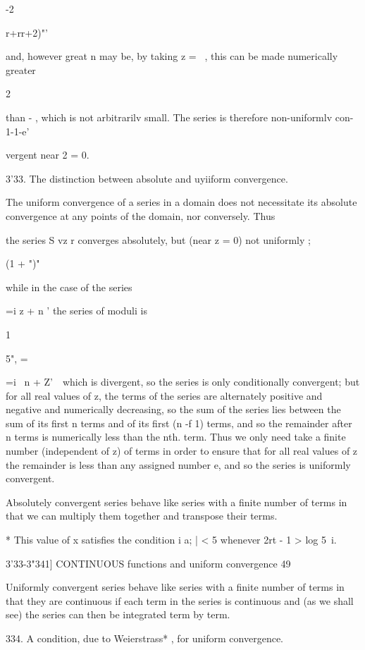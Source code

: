 -2

r+rr+2)"'

and, however great n may be, by taking z = ~, this can be made
numerically greater

2

than - , which is not arbitrarilv small. The series is therefore
non-uniformlv con- 1-1-e'

vergent near 2 = 0.

3'33. The distinction between absolute and uyiiform convergence.

The uniform convergence of a series in a domain does not necessitate
its absolute convergence at any points of the domain, nor conversely.
Thus

the series S vz r converges absolutely, but (near z = 0) not uniformly
;

(1 + ")"

while in the case of the series

 =i z + n ' the series of moduli is

1

5", =



 =i \ n + Z'\ \ which is divergent, so the series is only
conditionally convergent; but for all real values of z, the terms of
the series are alternately positive and negative and numerically
decreasing, so the sum of the series lies between the sum of its first
n terms and of its first (n -f 1) terms, and so the remainder after n
terms is numerically less than the nth. term. Thus we only need take a
finite number (independent of z) of terms in order to ensure that for
all real values of z the remainder is less than any assigned number e,
and so the series is uniformly convergent.

Absolutely convergent series behave like series with a finite number
of terms in that we can multiply them together and transpose their
terms.

* This value of x satisfies the condition i a; | < 5 whenever 2rt - 1
> log 5~i.



3'33-3"341] CONTINUOUS functions and uniform convergence 49

Uniformly convergent series behave like series with a finite number of
terms in that they are continuous if each term in the series is
continuous and (as we shall see) the series can then be integrated
term by term.

334. A condition, due to Weierstrass* , for uniform convergence.


